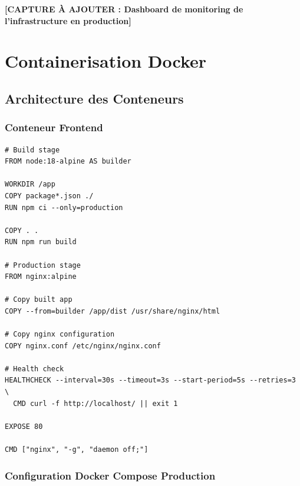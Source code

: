 \textbf{[CAPTURE À AJOUTER : Dashboard de monitoring de l'infrastructure en production]}

\section{Containerisation Docker}

\subsection{Architecture des Conteneurs}

\subsubsection{Conteneur Frontend}

\begin{lstlisting}[language=Docker, caption=Dockerfile pour le frontend]
# Build stage
FROM node:18-alpine AS builder

WORKDIR /app
COPY package*.json ./
RUN npm ci --only=production

COPY . .
RUN npm run build

# Production stage
FROM nginx:alpine

# Copy built app
COPY --from=builder /app/dist /usr/share/nginx/html

# Copy nginx configuration
COPY nginx.conf /etc/nginx/nginx.conf

# Health check
HEALTHCHECK --interval=30s --timeout=3s --start-period=5s --retries=3 \
  CMD curl -f http://localhost/ || exit 1

EXPOSE 80

CMD ["nginx", "-g", "daemon off;"]
\end{lstlisting}

\subsubsection{Configuration Docker Compose Production}


